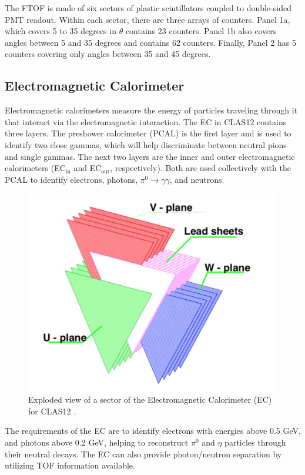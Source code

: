 The FTOF is made of six sectors of plastic scintillators coupled to double-sided PMT readout. Within each sector, there are three arrays of counters. Panel 1a, which covers 5 to 35 degrees in $\theta$ contains 23 counters. Panel 1b also covers angles between 5 and 35 degrees and contains 62 counters. Finally, Panel 2 has 5 counters covering only angles between 35 and 45 degrees. 

\subsection{Electromagnetic Calorimeter}
\label{sec:EC}
Electromagnetic calorimeters measure the energy of particles traveling through it that interact via the electromagnetic interaction. The EC in CLAS12 contains three layers. The preshower calorimeter (PCAL) is the first layer and is used to identify two close gammas, which will help discriminate between neutral pions and single gammas. The next two layers are the inner and outer electromagnetic calorimeters (EC$_{\mathrm{in}}$ and EC$_{\mathrm{out}}$, respectively). Both are used collectively with the PCAL to identify electrons, photons, $\pi^0 \rightarrow \gamma \gamma$, and neutrons.

\begin{figure}[h!]
	\centering
	\includegraphics[width=0.8\linewidth]{figures/ecal.png}
	\caption[Exploded view of a sector of the Electromagnetic Calorimeter (EC) for CLAS12.]{Exploded view of a sector of the Electromagnetic Calorimeter (EC) for CLAS12 \cite{clasnote:EC_geo}.}
	\label{fig:ecal}
\end{figure}

The requirements of the EC are to identify electrons with energies above 0.5 GeV, and photons above 0.2 GeV, helping to reconstruct $\pi^0$ and $\eta$ particles through their neutral decays. The EC can also provide photon/neutron separation by utilizing TOF information available.

